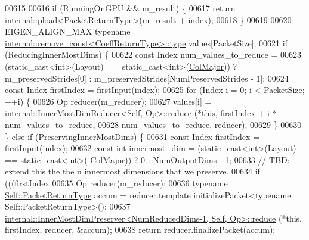 \begin{DoxyCode}
00615 
00616     \textcolor{keywordflow}{if} (RunningOnGPU && m\_result) \{
00617       \textcolor{keywordflow}{return} internal::pload<PacketReturnType>(m\_result + index);
00618     \}
00619 
00620     EIGEN\_ALIGN\_MAX \textcolor{keyword}{typename} \hyperlink{group___sparse_core___module}{internal::remove\_const<CoeffReturnType>::type}
       values[PacketSize];
00621     \textcolor{keywordflow}{if} (ReducingInnerMostDims) \{
00622       \textcolor{keyword}{const} Index num\_values\_to\_reduce =
00623         (\textcolor{keyword}{static\_cast<}\textcolor{keywordtype}{int}\textcolor{keyword}{>}(Layout) == static\_cast<int>(\hyperlink{group__enums_ggaacded1a18ae58b0f554751f6cdf9eb13a0cbd4bdd0abcfc0224c5fcb5e4f6669a}{ColMajor})) ? m\_preservedStrides[0] : 
      m\_preservedStrides[NumPreservedStrides - 1];
00624       \textcolor{keyword}{const} Index firstIndex = firstInput(index);
00625       \textcolor{keywordflow}{for} (Index i = 0; i < PacketSize; ++i) \{
00626         Op reducer(m\_reducer);
00627         values[i] = \hyperlink{struct_eigen_1_1internal_1_1_inner_most_dim_reducer}{internal::InnerMostDimReducer<Self, Op>::reduce}
      (*\textcolor{keyword}{this}, firstIndex + i * num\_values\_to\_reduce,
00628                                                                     num\_values\_to\_reduce, reducer);
00629       \}
00630     \} \textcolor{keywordflow}{else} \textcolor{keywordflow}{if} (PreservingInnerMostDims) \{
00631       \textcolor{keyword}{const} Index firstIndex = firstInput(index);
00632       \textcolor{keyword}{const} \textcolor{keywordtype}{int} innermost\_dim = (\textcolor{keyword}{static\_cast<}\textcolor{keywordtype}{int}\textcolor{keyword}{>}(Layout) == static\_cast<int>(
      \hyperlink{group__enums_ggaacded1a18ae58b0f554751f6cdf9eb13a0cbd4bdd0abcfc0224c5fcb5e4f6669a}{ColMajor})) ? 0 : NumOutputDims - 1;
00633       \textcolor{comment}{// TBD: extend this the the n innermost dimensions that we preserve.}
00634       \textcolor{keywordflow}{if} (((firstIndex %
00635         Op reducer(m\_reducer);
00636         \textcolor{keyword}{typename} \hyperlink{group___sparse_core___module}{Self::PacketReturnType} accum = reducer.template 
      initializePacket<typename Self::PacketReturnType>();
00637         \hyperlink{struct_eigen_1_1internal_1_1_inner_most_dim_preserver}{internal::InnerMostDimPreserver<NumReducedDims-1, Self, Op>::reduce}
      (*\textcolor{keyword}{this}, firstIndex, reducer, &accum);
00638         \textcolor{keywordflow}{return} reducer.finalizePacket(accum);

\end{DoxyCode}
